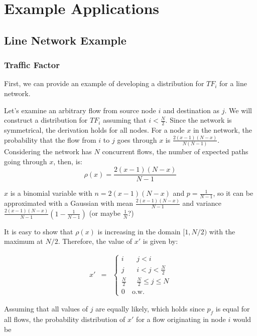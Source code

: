 \section{Example Applications}
\label{sec:example_applications}

\subsection{Line Network Example}

\subsubsection{Traffic Factor}
First, we can provide an example of developing a distribution for $TF_i$ for a line network.

Let's examine an arbitrary flow from source node $i$ and destination as $j$.  We will construct a distribution for $TF_i$ assuming that $i < \frac{N}{2}$.  Since the network is symmetrical, the derivation holds for all nodes.  For a node $x$ in the network, the probability that the flow from $i$ to $j$ goes through $x$ is $\frac{2(x-1)(N-x)}{N(N-1)}$.  Considering the network has $N$ concurrent flows, the number of expected paths going through $x$, then, is: %
\begin{equation*}
	\rho(x) = \frac{2(x-1)(N-x)}{N-1}
\end{equation*}

$x$ is a binomial variable with $n = 2(x-1)(N-x)$ and $p = \frac{1}{N-1}$, so it can be approximated with a Gaussian with mean $\frac{2(x-1)(N-x)}{N-1}$ and variance $\frac{2(x-1)(N-x)}{N-1}(1-\frac{1}{N-1})$ (or maybe $\frac{1}{N}$?)

It is easy to show that $\rho(x)$ is increasing in the domain $[1,N/2)$ with the maximum at $N/2$.  Therefore, the value of $x'$ is given by: 

\begin{eqnarray*}
	x' &=&
		\left\{\begin{array}{ll}
		i & \mbox{    } j < i \\
		j & \mbox{    } i < j < \frac{N}{2} \\
		\frac{N}{2} & \mbox{    } \frac{N}{2} \leq j \leq N \\ 
		0 &\mbox{o.w.}
		\end{array}\right.
\end{eqnarray*}

Assuming that all values of $j$ are equally likely, which holds since $p_f$ is equal for all flows, the probability distribution of $x'$ for a flow originating in node $i$ would be

